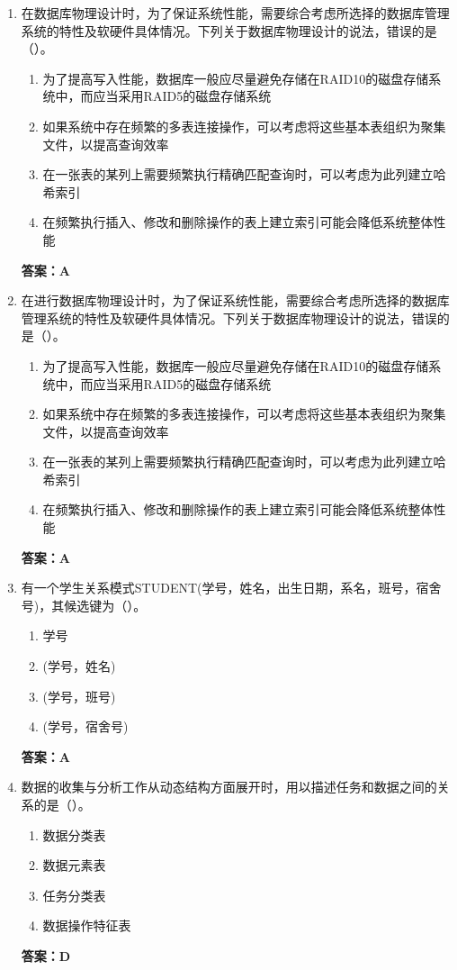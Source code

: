 \documentclass[12pt, a4paper]{article}
\begin{document}
\begin{enumerate}[label=\arabic*.]
	\item 在数据库物理设计时，为了保证系统性能，需要综合考虑所选择的数据库管理系统的特性及软硬件具体情况。下列关于数据库物理设计的说法，错误的是（\quad）。
	      \begin{enumerate}
		      \item 为了提高写入性能，数据库一般应尽量避免存储在RAID10的磁盘存储系统中，而应当采用RAID5的磁盘存储系统
		      \item 如果系统中存在频繁的多表连接操作，可以考虑将这些基本表组织为聚集文件，以提高查询效率
		      \item 在一张表的某列上需要频繁执行精确匹配查询时，可以考虑为此列建立哈希索引
		      \item 在频繁执行插入、修改和删除操作的表上建立索引可能会降低系统整体性能
	      \end{enumerate}
	      \textbf{答案：A}

	\item 在进行数据库物理设计时，为了保证系统性能，需要综合考虑所选择的数据库管理系统的特性及软硬件具体情况。下列关于数据库物理设计的说法，错误的是（\quad）。
	      \begin{enumerate}
		      \item 为了提高写入性能，数据库一般应尽量避免存储在RAID10的磁盘存储系统中，而应当采用RAID5的磁盘存储系统
		      \item 如果系统中存在频繁的多表连接操作，可以考虑将这些基本表组织为聚集文件，以提高查询效率
		      \item 在一张表的某列上需要频繁执行精确匹配查询时，可以考虑为此列建立哈希索引
		      \item 在频繁执行插入、修改和删除操作的表上建立索引可能会降低系统整体性能
	      \end{enumerate}
	      \textbf{答案：A}

	\item 有一个学生关系模式STUDENT(学号，姓名，出生日期，系名，班号，宿舍号)，其候选键为（\quad）。
	      \begin{enumerate}
		      \item 学号
		      \item (学号，姓名)
		      \item (学号，班号)
		      \item (学号，宿舍号)
	      \end{enumerate}
	      \textbf{答案：A}

	\item 数据的收集与分析工作从动态结构方面展开时，用以描述任务和数据之间的关系的是（\quad）。
	      \begin{enumerate}
		      \item 数据分类表
		      \item 数据元素表
		      \item 任务分类表
		      \item 数据操作特征表
	      \end{enumerate}
	      \textbf{答案：D}


\end{enumerate}
\end{document}

